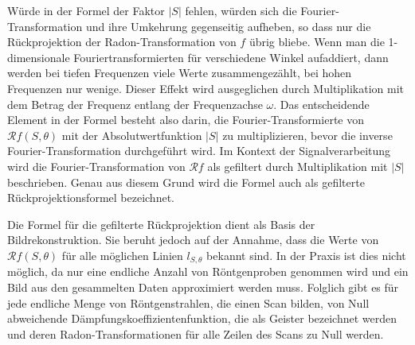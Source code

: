 Würde in der Formel der Faktor $|S|$ fehlen, würden sich die Fourier-Transformation und ihre Umkehrung gegenseitig aufheben, so dass nur die Rückprojektion der Radon-Transformation von $f$ übrig bliebe. Wenn man die 1-dimensionale Fouriertransformierten für verschiedene Winkel aufaddiert, dann werden bei tiefen Frequenzen viele Werte zusammengezählt, bei hohen Frequenzen nur wenige. Dieser Effekt wird ausgeglichen durch Multiplikation mit dem Betrag der Frequenz entlang der Frequenzachse $\omega$. Das entscheidende Element in der Formel besteht also darin, die Fourier-Transformierte von $\mathscr{R}f(S, \theta)$ mit der Absolutwertfunktion $|S|$ zu multiplizieren, bevor die inverse Fourier-Transformation durchgeführt wird. Im Kontext der Signalverarbeitung wird die Fourier-Transformation von $\mathscr{R}f$ als gefiltert durch Multiplikation mit $|S|$ beschrieben. Genau aus diesem Grund wird die Formel auch als \glqq gefilterte Rückprojektionsformel\grqq{} bezeichnet.

Die Formel für die gefilterte Rückprojektion dient als Basis der Bildrekonstruktion. Sie beruht jedoch auf der Annahme, dass die Werte von $\mathscr{R}f(S, \theta)$ für alle möglichen Linien $l_{S, \theta}$ bekannt sind. In der Praxis ist dies nicht möglich, da nur eine endliche Anzahl von Röntgenproben genommen wird und ein Bild aus den gesammelten Daten approximiert werden muss. Folglich gibt es für jede endliche Menge von Röntgenstrahlen, die einen Scan bilden, von Null abweichende Dämpfungskoeffizientenfunktion, die als \glqq Geister \grqq{} bezeichnet werden und deren Radon-Transformationen für alle Zeilen des Scans zu Null werden.




















